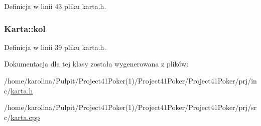 Definicja w linii 43 pliku karta.\-h.

\hypertarget{class_karta_a1d16b54a6d9d8f18ed2905eef20d3c58}{
\subsubsection[{kol}]{ Karta\-::kol}}\label{class_karta_a1d16b54a6d9d8f18ed2905eef20d3c58}


Definicja w linii 39 pliku karta.\-h.



Dokumentacja dla tej klasy została wygenerowana z plików\-:\begin{DoxyCompactItemize}
\item 
/home/karolina/\-Pulpit/\-Project41\-Poker(1)/\-Project41\-Poker/\-Project41\-Poker/prj/inc/\hyperlink{karta_8h}{karta.\-h}\item 
/home/karolina/\-Pulpit/\-Project41\-Poker(1)/\-Project41\-Poker/\-Project41\-Poker/prj/src/\hyperlink{karta_8cpp}{karta.\-cpp}\end{DoxyCompactItemize}
